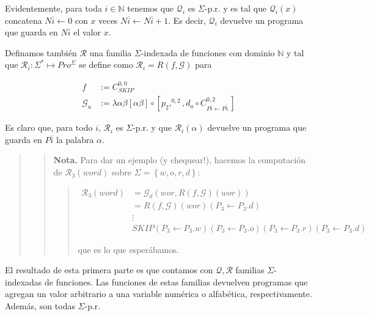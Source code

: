 \documentclass[a4paper, 12pt]{article}
\begin{document}
Evidentemente, para toda $i \in \mathbb{N}$ tenemos que $\mathcal{Q}_i$ es
$\Sigma$-p.r. y es tal que $\mathcal{Q}_i(x)$ concatena $N\overline{i}
\leftarrow 0$ con $x$ veces $N\overline{i} \leftarrow N\overline{i} + 1$. Es
decir, $\mathcal{Q}_i$ devuelve un programa que guarda en $N\overline{i}$ el valor
$x$.  

Definamos también $\mathcal{R}$ una familia $\Sigma$-indexada de funciones con
dominio $\mathbb{N}$ y tal que $ \mathcal{R}_i : \Sigma^{*} \mapsto
Pro^{\Sigma}$ se define como $\mathcal{R}_i = R(f, \mathcal{G})$ para 

\begin{align*}
    f &:= C_{SKIP}^{0, 0}\\
    \mathcal{G}_a &:= \lambda \alpha\beta \left[ \alpha\beta \right] \circ
    \left[p_2,^{0, 2}, d_a \circ
    C^{0, 2}_{P\overline{i} \leftarrow P\overline{i}.}\right] 
\end{align*} 

Es claro que, para todo $i$, $\mathcal{R}_i$ es $\Sigma$-p.r. y que
$\mathcal{R}_i(\alpha)$ devuelve un programa que guarda en $P\overline{i}$ la
palabra $\alpha$.


\small
\begin{quote}

\begin{quote}
\textbf{Nota.} Para dar un ejemplo (y chequear!), hacemos la computación de
$\mathcal{R}_{3}(word)$ sobre $\Sigma = \left\{ w, o, r, d \right\} $:

\begin{quote}
    \begin{align*}
        \mathcal{R}_3(word) &= \mathcal{G}_d(wor, R(f, \mathcal{G})(wor)) \\ 
                        &= R(f, \mathcal{G})(wor) (P_3 \leftarrow P_3.d)\\ 
                        &\vdots \\ 
                        &SKIP(P_3 \leftarrow  P_3.w)(P_3 \leftarrow
                        P_3.o)(P_3 \leftarrow P_3.r)(P_3 \leftarrow P_3.d)
    \end{align*}

    que es lo que esperábamos.
\end{quote}
\end{quote}

\end{quote}
\normalsize

El resultado de esta primera parte es que contamos con $\mathcal{Q},
\mathcal{R}$ familias $\Sigma$-indexadas de funciones. Las funciones de estas familias
devuelven programas que agregan un valor arbitrario a una variable numérica o
alfabética, respectivamente. Además, son todas $\Sigma$-p.r. 
\end{document}
